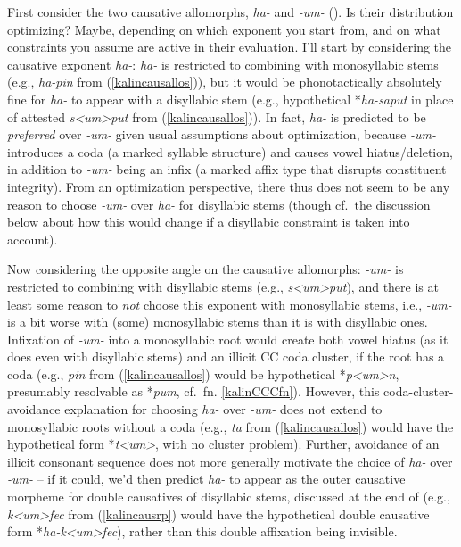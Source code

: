 \documentclass[output=paper]{langscibook}
\begin{document}
First consider the two causative allomorphs, \textit{ha-} and \textit{-um-} (). Is their distribution optimizing? Maybe, depending on which exponent you start from, and on what constraints you assume are active in their evaluation. I'll start by considering the causative exponent \textit{ha-}: \textit{ha-} is restricted to combining with monosyllabic stems (e.g., \textit{ha-pin} from (\ref{kalincausallos})), but it would be phonotactically absolutely fine for  \textit{ha-} to appear with a disyllabic stem (e.g., hypothetical *\textit{ha-saput} in place of attested \textit{s<um>put} from (\ref{kalincausallos})). In fact, \textit{ha-} is predicted to be {\it preferred} over \textit{-um-} given usual assumptions about optimization, because \textit{-um-} introduces a coda (a marked syllable structure) and causes vowel hiatus/deletion, in addition to \textit{-um-}  being an infix (a marked affix type that disrupts constituent integrity). From an optimization perspective, there thus does not seem to be any reason to choose \textit{-um-} over \textit{ha-} for disyllabic stems (though cf.\ the discussion below about how this would change if a disyllabic constraint is taken into account).

Now considering the opposite angle on the causative allomorphs: \textit{-um-} is restricted to combining with disyllabic stems (e.g., \textit{s<um>put}), and there is at least some reason to {\it not} choose this exponent with monosyllabic stems, i.e., \textit{-um-} is a bit worse with (some) monosyllabic stems than it is with disyllabic ones. Infixation of \textit{-um-} into a monosyllabic root would create both vowel hiatus (as it does even with disyllabic stems) and an illicit CC coda cluster, if the root has a coda (e.g., \textit{pin} from (\ref{kalincausallos}) would be hypothetical *\textit{p<um>n}, presumably resolvable as *\textit{pum}, cf.\ fn. \ref{kalinCCCfn}). However, this coda-cluster-avoidance explanation for choosing \textit{ha-} over \textit{-um-} does not extend to monosyllabic roots without a coda (e.g., \textit{ta} from (\ref{kalincausallos}) would have the hypothetical form *\textit{t<um>}, with no cluster problem). Further, avoidance of an illicit consonant sequence does not more generally motivate the choice of \textit{ha-} over \textit{-um-} -- if it could, we'd then predict \textit{ha-} to appear as the outer causative morpheme for double causatives of disyllabic stems, discussed at the end of  (e.g., \textit{k<um>fec} from (\ref{kalincausrp}) would have the hypothetical double causative form *\textit{ha-k<um>fec}), rather than this double affixation being invisible.
\end{document}
